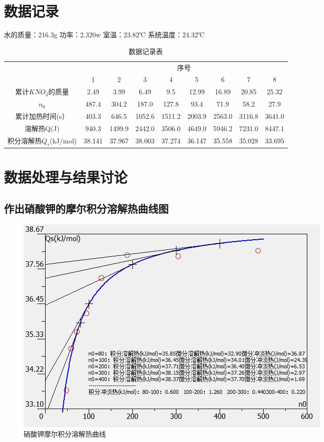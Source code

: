 \documentclass[UTF8]{ctexart}
\begin{document}
\section{数据记录}
    水的质量：216.3g  功率：2.320w 室温：23.82℃ 系统温度：24.32℃\\ 
\begin{table}[H]
    \centering
    \caption{数据记录表}
    \begin{tabular}{ccccccccc}
    \toprule
    & \multicolumn{8}{c}{序号} \\
    \cmidrule{2-9} 
    & 1 & 2 & 3 & 4 & 5 & 6 & 7 & 8 \\
    \midrule
    累计$KNO_3的质量$ & 2.49 & 3.99 & 6.49 & 9.5 & 12.99 & 16.89 & 20.85 & 25.32 \\
    $n_0$ & 487.4 & 304.2 & 187.0 & 127.8 & 93.4 & 71.9 & 58.2 & 27.9 \\
    累计加热时间(s）& 403.3 & 646.5 & 1052.6 & 1511.2 & 2003.9 & 2563.0 & 3116.8 & 3641.0 \\
    溶解热Q(J) & 940.3 & 1499.9 & 2442.0 & 3506.0 & 4649.0 & 5946.2 & 7231.0 & 8447.1 \\
    积分溶解热$Q_s$(kJ/mol) & 38.141 & 37.967 & 38.003 & 37.274 & 36.147 & 35.558 & 35.028 & 33.695 \\
    \bottomrule
    \end{tabular}
\end{table}

\section{数据处理与结果讨论}
\subsection{作出硝酸钾的摩尔积分溶解热曲线图}
\begin{figure}[H]
  \centering
  \includegraphics{1.jpg} 
  \caption{硝酸钾摩尔积分溶解热曲线}

\end{figure}
\end{document}
